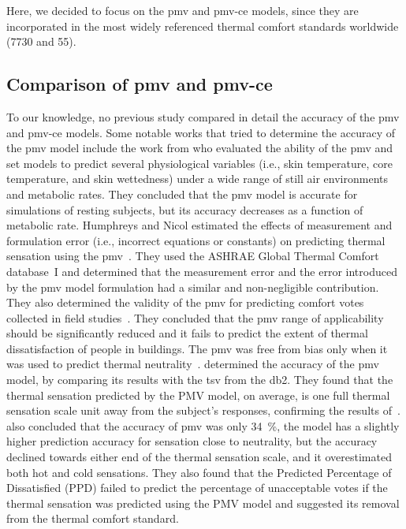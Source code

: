Here, we decided to focus on the \ac{pmv} and \ac{pmv-ce} models, since they are incorporated in the most widely referenced thermal comfort standards worldwide (\gls{7730} and \gls{55}).

\subsection{Comparison of \ac{pmv} and \ac{pmv-ce}}\label{subsec:comparision-of-pmv-formulations}
To our knowledge, no previous study compared in detail the accuracy of the \ac{pmv} and \ac{pmv-ce} models.
Some notable works that tried to determine the accuracy of the \ac{pmv} model include the work from  who evaluated the ability of the \ac{pmv} and \ac{set} models to predict several physiological variables (i.e., skin temperature, core temperature, and skin wettedness) under a wide range of still air environments and metabolic rates.
They concluded that the \ac{pmv} model is accurate for simulations of resting subjects, but its accuracy decreases as a function of metabolic rate.
Humphreys and Nicol estimated the effects of measurement and formulation error (i.e., incorrect equations or constants) on predicting thermal sensation using the \ac{pmv}~\cite{Humphreys2000}.
They used the ASHRAE Global Thermal Comfort database~I and determined that the measurement error and the error introduced by the \ac{pmv} model formulation had a similar and non-negligible contribution.
They also determined the validity of the \ac{pmv} for predicting comfort votes collected in field studies~\cite{Humphreys2002}.
They concluded that the \ac{pmv} range of applicability should be significantly reduced and it fails to predict the extent of thermal dissatisfaction of people in buildings.
The \ac{pmv} was free from bias only when it was used to predict thermal neutrality~\cite{Humphreys2002}.
 determined the accuracy of the \ac{pmv} model, by comparing its results with the \ac{tsv} from the \ac{db2}.
They found that the thermal sensation predicted by the PMV model, on average, is one full thermal sensation scale unit away from the subject’s responses, confirming the results of~.
 also concluded that the accuracy of \ac{pmv} was only \qty{34}{\percent}, the model has a slightly higher prediction accuracy for sensation close to neutrality, but the accuracy declined towards either end of the thermal sensation scale, and it overestimated both hot and cold sensations.
They also found that the Predicted Percentage of Dissatisfied (PPD) failed to predict the percentage of unacceptable votes if the thermal sensation was predicted using the PMV model and suggested its removal from the thermal comfort standard.
